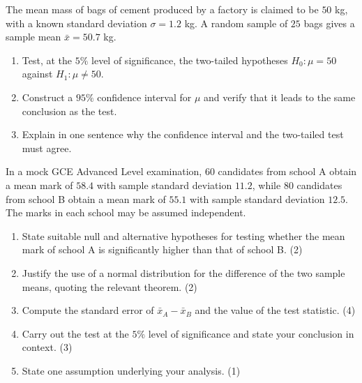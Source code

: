 \documentclass[11pt]{article}
\newcounter{popsec}
\newcounter{popsub}
\newcommand{\courssub}[1]{%
  \stepcounter{popsub}%
  \par\vspace{9pt}\noindent{\popxbold\fontsize{11.5}{13}\selectfont\color{popink}{\color{poporange}\thepopsec.\thepopsub}\hspace{6pt}#1}\par\nopagebreak\vspace{4pt}
}
\begin{document}
\begin{exercice}
The mean mass of bags of cement produced by a factory is claimed to be $50$ kg, with a known standard deviation $\sigma = 1.2$ kg. A random sample of $25$ bags gives a sample mean $\bar{x} = 50.7$ kg.
\begin{enumerate}
\item Test, at the $5\%$ level of significance, the two-tailed hypotheses $H_0: \mu = 50$ against $H_1: \mu \neq 50$.
\item Construct a $95\%$ confidence interval for $\mu$ and verify that it leads to the same conclusion as the test.
\item Explain in one sentence why the confidence interval and the two-tailed test must agree.
\end{enumerate}
\end{exercice}

\courssub{I prepare for the GCE}

\begin{exercice}
In a mock GCE Advanced Level examination, $60$ candidates from school A obtain a mean mark of $58.4$ with sample standard deviation $11.2$, while $80$ candidates from school B obtain a mean mark of $55.1$ with sample standard deviation $12.5$. The marks in each school may be assumed independent.
\begin{enumerate}
\item State suitable null and alternative hypotheses for testing whether the mean mark of school A is significantly higher than that of school B. \hfill (2)
\item Justify the use of a normal distribution for the difference of the two sample means, quoting the relevant theorem. \hfill (2)
\item Compute the standard error of $\bar{x}_A - \bar{x}_B$ and the value of the test statistic. \hfill (4)
\item Carry out the test at the $5\%$ level of significance and state your conclusion in context. \hfill (3)
\item State one assumption underlying your analysis. \hfill (1)
\end{enumerate}
\end{exercice}
\end{document}
